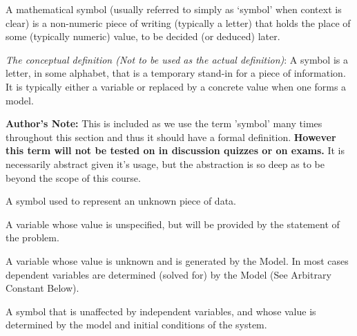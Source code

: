 \documentclass{ximeraXloud}
\begin{document}
\begin{definition}
    A mathematical symbol (usually referred to simply as `symbol' when context is clear) is a non-numeric piece of writing (typically a letter) that holds the place of some (typically numeric) value, to be decided (or deduced) later.
    
        \emph{The conceptual definition (Not to be used as the actual definition)}: A symbol is a letter, in some alphabet, that is a temporary stand-in for a piece of information. It is typically either a variable or replaced by a concrete value when one forms a model.
        
        \textbf{Author's Note:} This is included as we use the term 'symbol' many times throughout this section and thus it should have a formal definition. \textbf{However this term will not be tested on in discussion quizzes or on exams.} It is necessarily abstract given it's usage, but the abstraction is so deep as to be beyond the scope of this course.
\end{definition}

\begin{definition}[Variable]
    A symbol used to represent an unknown piece of data.
\end{definition}

\begin{definition}
    A variable whose value is unspecified, but will be provided by the statement of the problem.
\end{definition}

\begin{definition}
    A variable whose value is unknown and is generated by the Model. In most cases dependent variables are determined (solved for) by the Model (See Arbitrary Constant Below).
\end{definition}

\begin{definition}
    A symbol that is unaffected by independent variables, and whose value is determined by the model and initial conditions of the system.
\end{definition}
\end{document}
